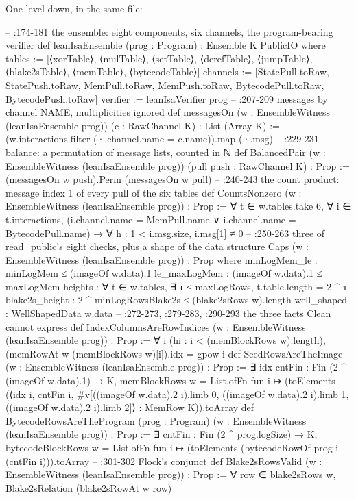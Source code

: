 One level down, in the same file:
\begin{leancode}
-- :174-181  the ensemble: eight components, six channels, the program-bearing verifier
def leanIsaEnsemble (prog : Program) : Ensemble K PublicIO where
  tables := [⟨xorTable⟩, ⟨mulTable⟩, ⟨setTable⟩, ⟨derefTable⟩, ⟨jumpTable⟩, ⟨blake2sTable⟩,
    ⟨memTable⟩, ⟨bytecodeTable⟩]
  channels := [StatePull.toRaw, StatePush.toRaw, MemPull.toRaw, MemPush.toRaw,
    BytecodePull.toRaw, BytecodePush.toRaw]
  verifier := leanIsaVerifier prog
-- :207-209  messages by channel NAME, multiplicities ignored
def messagesOn (w : EnsembleWitness (leanIsaEnsemble prog)) (c : RawChannel K) :
    List (Array K) :=
  (w.interactions.filter (·.channel.name = c.name)).map (·.msg)
-- :229-231  balance: a permutation of message lists, counted in ℕ
def BalancedPair (w : EnsembleWitness (leanIsaEnsemble prog)) (pull push : RawChannel K) :
    Prop :=
  (messagesOn w push).Perm (messagesOn w pull)
-- :240-243  the count product: message index 1 of every pull of the six tables
def CountsNonzero (w : EnsembleWitness (leanIsaEnsemble prog)) : Prop :=
  ∀ t ∈ w.tables.take 6, ∀ i ∈ t.interactions,
    (i.channel.name = MemPull.name ∨ i.channel.name = BytecodePull.name) →
      ∀ h : 1 < i.msg.size, i.msg[1] ≠ 0
-- :250-263  three of read_public's eight checks, plus a shape of the data
structure Caps (w : EnsembleWitness (leanIsaEnsemble prog)) : Prop where
  minLogMem_le : minLogMem ≤ (imageOf w.data).1
  le_maxLogMem : (imageOf w.data).1 ≤ maxLogMem
  heights : ∀ t ∈ w.tables, ∃ τ ≤ maxLogRows, t.table.length = 2 ^ τ
  blake2s_height : 2 ^ minLogRowsBlake2s ≤ (blake2sRows w).length
  well_shaped : WellShapedData w.data
-- :272-273, :279-283, :290-293  the three facts Clean cannot express
def IndexColumnsAreRowIndices (w : EnsembleWitness (leanIsaEnsemble prog)) : Prop :=
  ∀ i (hi : i < (memBlockRows w).length), (memRowAt w (memBlockRows w)[i]).idx = gpow i
def SeedRowsAreTheImage (w : EnsembleWitness (leanIsaEnsemble prog)) : Prop :=
  ∃ idx cntFin : Fin (2 ^ (imageOf w.data).1) → K,
    memBlockRows w = List.ofFn fun i ↦
      (toElements (⟨idx i, cntFin i, #v[((imageOf w.data).2 i).limb 0,
        ((imageOf w.data).2 i).limb 1, ((imageOf w.data).2 i).limb 2]⟩ : MemRow K)).toArray
def BytecodeRowsAreTheProgram (prog : Program) (w : EnsembleWitness (leanIsaEnsemble prog)) :
    Prop :=
  ∃ cntFin : Fin (2 ^ prog.logSize) → K,
    bytecodeBlockRows w = List.ofFn fun i ↦ (toElements (bytecodeRowOf prog i (cntFin i))).toArray
-- :301-302  Flock's conjunct
def Blake2sRowsValid (w : EnsembleWitness (leanIsaEnsemble prog)) : Prop :=
  ∀ row ∈ blake2sRows w, Blake2sRelation (blake2sRowAt w row)
\end{leancode}


